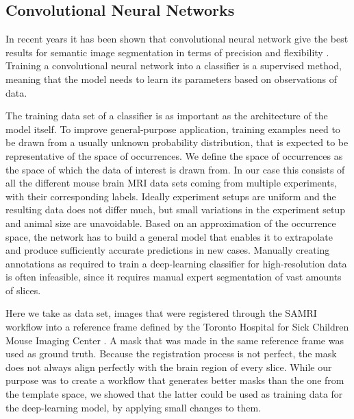 \subsection{Convolutional Neural Networks} \label{sec:Convolutional Neural Networks}
In recent years it has been shown that convolutional neural network give the best results for semantic image segmentation in terms of precision and flexibility \cite{geng_survey_2018, ronneberger_u-net:_2015}.
Training a convolutional neural network into a classifier is a supervised method, meaning that the model needs to learn its parameters based on observations of data.

The training data set of a classifier is as important as the architecture of the model itself.
To improve general-purpose application, training examples need to be drawn from a usually unknown probability distribution, that is expected to be representative of the space of occurrences.
We define the space of occurrences as the space of which the data of interest is drawn from.
In our case this consists of all the different mouse brain MRI data sets coming from multiple experiments, with their corresponding labels. 
Ideally experiment setups are uniform and the resulting data does not differ much, but small variations in the experiment setup and animal size are unavoidable.
Based on an approximation of the occurrence space, the network has to build a general model that enables it to extrapolate and produce sufficiently accurate predictions in new cases.
Manually creating annotations as required to train a deep-learning classifier for high-resolution data is often infeasible, since it requires manual expert segmentation of vast amounts of slices.

Here we take as data set, images that were registered through the SAMRI workflow into a reference frame defined by the Toronto Hospital for Sick Children Mouse Imaging Center \cite{dsu}.
A mask that was made in the same reference frame was used as ground truth.
Because the registration process is not perfect, the mask does not always align perfectly with the brain region of every slice.
While our purpose was to create a workflow that generates better masks than the one from the template space, we showed that the latter could be used as training data for the deep-learning model, by applying small changes to them.